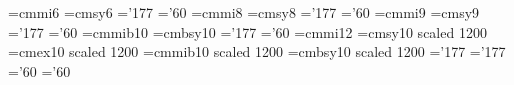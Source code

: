%
%
\font\sixi=cmmi6
\font\sixsy=cmsy6
\skewchar\sixi='177
\skewchar\sixsy='60
\font\eighti=cmmi8
\font\eightsy=cmsy8
\skewchar\eighti='177
\skewchar\eightsy='60
\font\ninei=cmmi9
\font\ninesy=cmsy9
\skewchar\ninei='177
\skewchar\ninesy='60
\font\tenmib=cmmib10
\font\tenbsy=cmbsy10
\skewchar\tenmib='177
\skewchar\tenbsy='60
\font\twelvei=cmmi12
\font\twelvesy=cmsy10 scaled 1200
\font\twelveex=cmex10 scaled 1200
\font\twelvemib=cmmib10 scaled 1200
\font\twelvebsy=cmbsy10 scaled 1200
\skewchar\twelvei='177
\skewchar\twelvemib='177
\skewchar\twelvesy='60
\skewchar\twelvebsy='60
